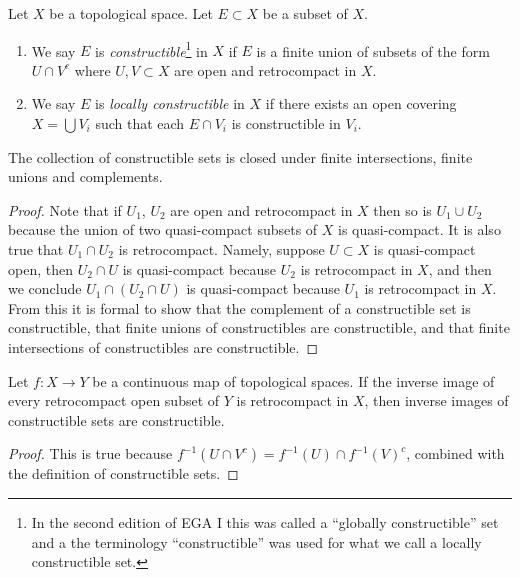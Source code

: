 \begin{definition}
\label{definition-constructible}
Let $X$ be a topological space. Let $E \subset X$ be a subset of $X$.
\begin{enumerate}
\item We say $E$ is {\it constructible}\footnote{In the second edition
of EGA I \cite{EGA1-second} this was called a ``globally constructible''
set and a the terminology ``constructible'' was used for what we call a locally
constructible set.}
in $X$ if $E$ is a finite union
of subsets of the form $U \cap V^c$ where $U, V \subset X$ are open and
retrocompact in $X$.
\item We say $E$ is {\it locally constructible} in $X$ if there exists an open
covering $X = \bigcup V_i$ such that each $E \cap V_i$ is constructible
in $V_i$.
\end{enumerate}
\end{definition}

\begin{lemma}
\label{lemma-constructible}
The collection of constructible sets is closed under
finite intersections, finite unions and complements.
\end{lemma}

\begin{proof}
Note that if $U_1$, $U_2$ are open and retrocompact in $X$
then so is $U_1 \cup U_2$ because the union of two quasi-compact
subsets of $X$ is quasi-compact. It is also true that
$U_1 \cap U_2$ is retrocompact. Namely, suppose $U \subset X$
is quasi-compact open, then $U_2 \cap U$ is quasi-compact because
$U_2$ is retrocompact in $X$, and then we conclude
$U_1 \cap (U_2 \cap U)$ is quasi-compact because $U_1$ is
retrocompact in $X$. From this it is formal to show that
the complement of a constructible set is constructible,
that finite unions of constructibles are constructible, and
that finite intersections of constructibles are constructible.
\end{proof}

\begin{lemma}
\label{lemma-inverse-images-constructibles}
Let $f : X \to Y$ be a continuous map of topological spaces.
If the inverse image of every retrocompact open subset of $Y$
is retrocompact in $X$, then inverse images of constructible
sets are constructible.
\end{lemma}

\begin{proof}
This is true because $f^{-1}(U \cap V^c) = f^{-1}(U) \cap f^{-1}(V)^c$,
combined with the definition of constructible sets.
\end{proof}

